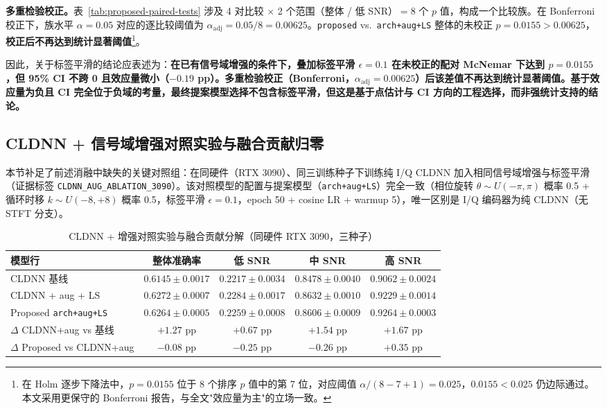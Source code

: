 \textbf{多重检验校正。}\label{par:multiple-testing}表~\ref{tab:proposed-paired-tests} 涉及 4 对比较 $\times$ 2 个范围（整体 / 低 SNR）$= 8$ 个 $p$ 值，构成一个比较族。在 Bonferroni 校正下，族水平 $\alpha = 0.05$ 对应的逐比较阈值为 $\alpha_{\mathrm{adj}} = 0.05/8 = 0.00625$。\texttt{proposed} vs.\ \texttt{arch+aug+LS} 整体的未校正 $p = 0.0155 > 0.00625$，\textbf{校正后不再达到统计显著阈值}\footnote{在 Holm 逐步下降法中，$p = 0.0155$ 位于 8 个排序 $p$ 值中的第 7 位，对应阈值 $\alpha/(8-7+1) = 0.025$，$0.0155 < 0.025$ 仍边际通过。本文采用更保守的 Bonferroni 报告，与全文"效应量为主"的立场一致。}。

因此，关于标签平滑的结论应表述为：\textbf{在已有信号域增强的条件下，叠加标签平滑 $\epsilon = 0.1$ 在未校正的配对 McNemar 下达到 $p = 0.0155$，但 95\% CI 不跨 0 且效应量微小（$-0.19$ pp）。多重检验校正（Bonferroni，$\alpha_{\mathrm{adj}} = 0.00625$）后该差值不再达到统计显著阈值。基于效应量为负且 CI 完全位于负域的考量，最终提案模型选择不包含标签平滑，但这是基于点估计与 CI 方向的工程选择，而非强统计支持的结论。}

\subsection{CLDNN + 信号域增强对照实验与融合贡献归零}\label{sec:cldnn-aug-control}

本节补足了前述消融中缺失的关键对照组：在同硬件（RTX 3090）、同三训练种子下训练纯 I/Q CLDNN 加入相同信号域增强与标签平滑（证据标签 \texttt{CLDNN\_AUG\_ABLATION\_3090}）。该对照模型的配置与提案模型（\texttt{arch+aug+LS}）完全一致（相位旋转 $\theta \sim U(-\pi,\pi)$ 概率 0.5 + 循环时移 $k \sim U(-8,+8)$ 概率 0.5，标签平滑 $\epsilon = 0.1$，epoch 50 + cosine LR + warmup 5），唯一区别是 I/Q 编码器为纯 CLDNN（无 STFT 分支）。

\begin{table}[htbp]
  \centering
  \caption{CLDNN + 增强对照实验与融合贡献分解（同硬件 RTX 3090，三种子）}
  \label{tab:cldnn-aug-control}
  \small
  \begin{tabularx}{\textwidth}{Xcccc}
    \toprule
    模型行 & 整体准确率 & 低 SNR & 中 SNR & 高 SNR \\
    \midrule
    CLDNN 基线 & $0.6145\pm0.0017$ & $0.2217\pm0.0034$ & $0.8478\pm0.0040$ & $0.9062\pm0.0024$ \\
    CLDNN + aug + LS & $\mathbf{0.6272\pm0.0007}$ & $\mathbf{0.2284\pm0.0017}$ & $\mathbf{0.8632\pm0.0010}$ & $0.9229\pm0.0014$ \\
    Proposed \texttt{arch+aug+LS} & $0.6264\pm0.0005$ & $0.2259\pm0.0008$ & $0.8606\pm0.0009$ & $\mathbf{0.9264\pm0.0003}$ \\
    \midrule
    $\Delta$ CLDNN+aug vs 基线 & $+1.27$ pp & $+0.67$ pp & $+1.54$ pp & $+1.67$ pp \\
    $\Delta$ Proposed vs CLDNN+aug & $-0.08$ pp & $-0.25$ pp & $-0.26$ pp & $+0.35$ pp \\
    \bottomrule
  \end{tabularx}
\end{table}

